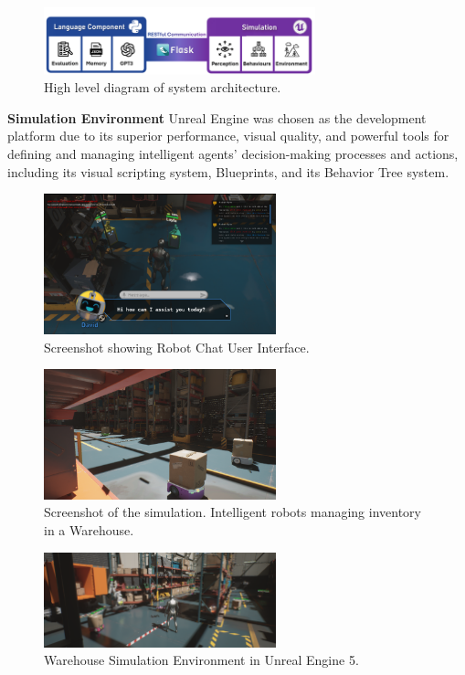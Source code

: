 \documentclass[pdflatex,sn-mathphys-num]{sn-jnl}%
\theoremstyle{thmstyleone}%
\theoremstyle{thmstyletwo}%
\theoremstyle{thmstylethree}%
\begin{document}
\begin{figure}[h]
\centering
\includegraphics[width=0.7\textwidth]{figures/Picture2.png}
\caption{High level diagram of system architecture.}\label{fig3}
\end{figure}

\textbf{Simulation Environment
}Unreal Engine was chosen as the development platform due to its superior performance, visual quality, and powerful tools for defining and managing intelligent agents' decision-making processes and actions, including its visual scripting system, Blueprints, and its Behavior Tree system.
\begin{figure}[h]
\centering
\includegraphics[width=0.6\textwidth]{figures/Picture9.png}
\caption{Screenshot showing Robot Chat User Interface.}\label{fig4}
\end{figure}
\begin{figure}[h]
\centering
\includegraphics[width=0.6\textwidth]{figures/Picture10.png}
\caption{Screenshot of the simulation. Intelligent robots managing inventory in a Warehouse.}\label{fig5}
\end{figure}
\begin{figure}[H]
\centering
\includegraphics[width=0.6\textwidth]{figures/Picture14.png}
\caption{Warehouse Simulation Environment in Unreal Engine 5.}\label{fig6}
\end{figure}
\end{document}
